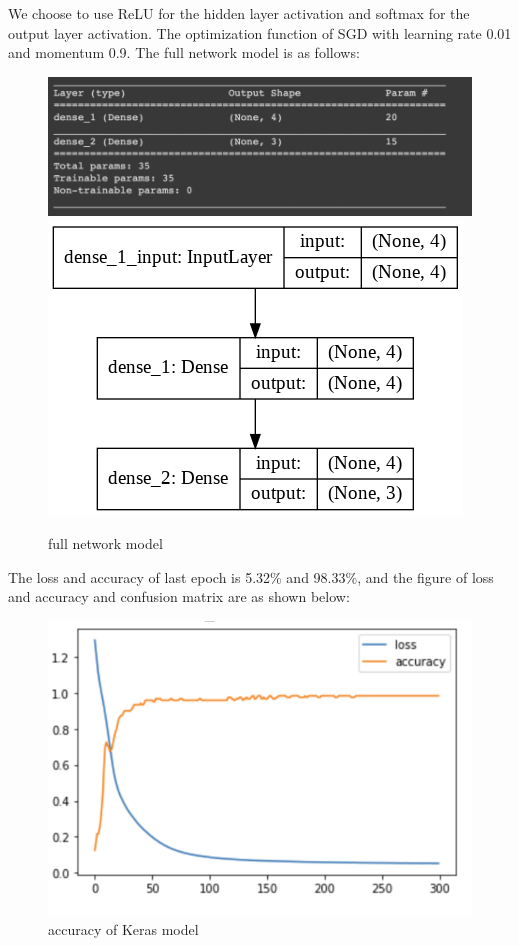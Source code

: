 \documentclass{article}
\begin{document}
We choose to use ReLU  for the hidden layer activation and softmax for the output layer activation. The optimization function of SGD with learning rate 0.01 and momentum 0.9. The full network model is as follows:
\begin{figure}[H]
	\centering
	\includegraphics[scale=0.2]{model.png}
	\includegraphics[scale=0.3]{model_plot.png}
	\caption{full network model}
\end{figure}
\noindent
The loss and accuracy of last epoch is 5.32\% and 98.33\%, and the figure of loss and accuracy and confusion matrix are as shown below:

\begin{figure}[H]
\centering
\includegraphics[scale=0.5]{accuracy.png}
\caption{accuracy of Keras model}
\end{figure}
\end{document}
